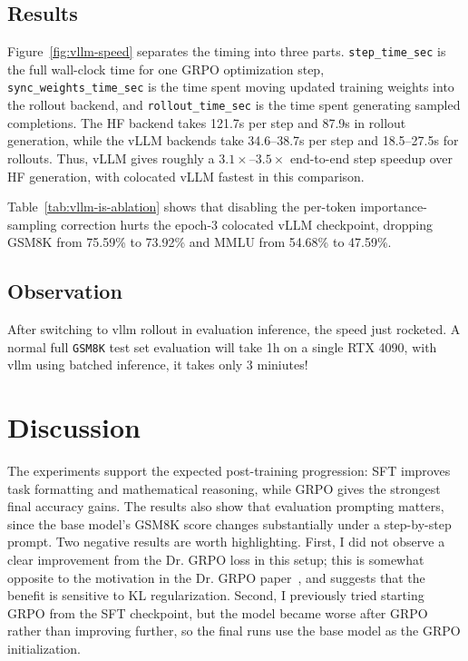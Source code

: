 \documentclass[11pt]{article}
\begin{document}
\subsection{Results}
Figure~\ref{fig:vllm-speed} separates the timing into three parts. \texttt{step\_time\_sec} is the full wall-clock time for one GRPO optimization step, \texttt{sync\_weights\_time\_sec} is the time spent moving updated training weights into the rollout backend, and \texttt{rollout\_time\_sec} is the time spent generating sampled completions. The HF backend takes 121.7s per step and 87.9s in rollout generation, while the vLLM backends take 34.6--38.7s per step and 18.5--27.5s for rollouts. Thus, vLLM gives roughly a \(3.1\times\)--\(3.5\times\) end-to-end step speedup over HF generation, with colocated vLLM fastest in this comparison.

Table~\ref{tab:vllm-is-ablation} shows that disabling the per-token importance-sampling correction hurts the epoch-3 colocated vLLM checkpoint, dropping GSM8K from 75.59\% to 73.92\% and MMLU from 54.68\% to 47.59\%.

\subsection{Observation}
After switching to vllm rollout in evaluation inference, the speed just rocketed. A normal full \texttt{GSM8K} test set evaluation will take 1h on a single RTX 4090, with vllm using batched inference, it takes only 3 miniutes!

\section{Discussion}
The experiments support the expected post-training progression: SFT improves task formatting and mathematical reasoning, while GRPO gives the strongest final accuracy gains. The results also show that evaluation prompting matters, since the base model's GSM8K score changes substantially under a step-by-step prompt. Two negative results are worth highlighting. First, I did not observe a clear improvement from the Dr. GRPO loss in this setup; this is somewhat opposite to the motivation in the Dr. GRPO paper~\cite{liu2025understandingr1zeroliketrainingcritical}, and suggests that the benefit is sensitive to KL regularization. Second, I previously tried starting GRPO from the SFT checkpoint, but the model became worse after GRPO rather than improving further, so the final runs use the base model as the GRPO initialization.
\end{document}
